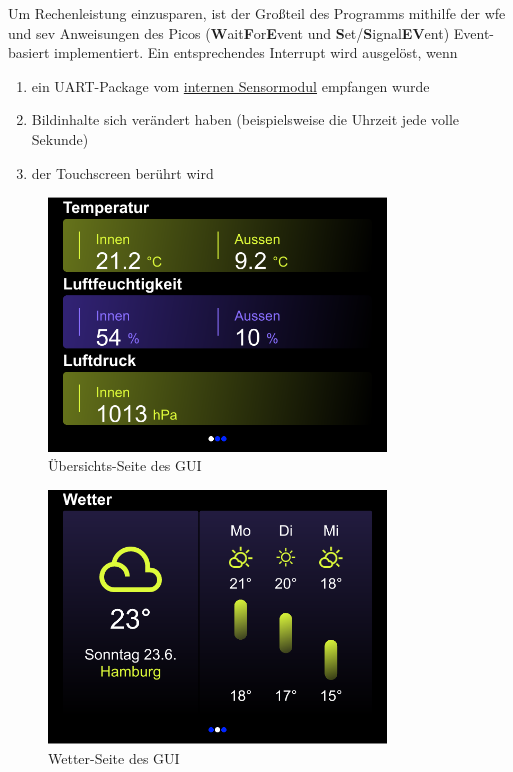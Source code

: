 \documentclass[a4paper,11pt]{article}
\begin{document}
\vspace{0.3cm}
\noindent
Um Rechenleistung einzusparen, ist der Großteil des Programms mithilfe der wfe und sev Anweisungen des Picos (\textbf{W}ait\textbf{F}or\textbf{E}vent und \textbf{S}et/\textbf{S}ignal\textbf{EV}ent) Event-basiert implementiert.
Ein entsprechendes Interrupt wird ausgelöst, wenn
\begin{enumerate}
	\item ein UART-Package vom \hyperref[subsub:sensorModul_int]{internen Sensormodul} empfangen wurde
	\item Bildinhalte sich verändert haben (beispielsweise die Uhrzeit jede volle Sekunde)
	\item der Touchscreen berührt wird
\end{enumerate}



\begin{figure}[H]
	\centering
	\includegraphics[width=0.8\textwidth]{Overview}
	\caption{Übersichts-Seite des GUI}
	\label{fig:gui-overview}
\end{figure}

\begin{figure}[H]
	\centering
	\includegraphics[width=0.8\textwidth]{Weather}
	\caption{Wetter-Seite des GUI}
	\label{fig:gui-overview}
\end{figure}
\end{document}
